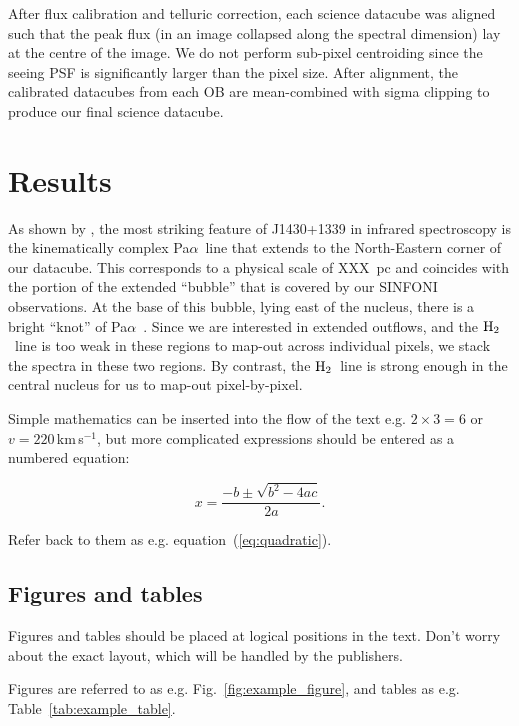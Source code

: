 \documentclass[a4paper,fleqn,usenatbib]{mnras}
\newcommand{\pa}{Pa$\alpha$}
\newcommand{\htwo}{${\rm H_{2}}$}
\begin{document}
After flux calibration and telluric correction, each science datacube was aligned such that the peak flux (in an image collapsed along the spectral dimension) lay at the centre of the image. We do not perform sub-pixel centroiding since the seeing PSF is significantly larger than the pixel size. After alignment, the calibrated datacubes from each OB are mean-combined with sigma clipping to produce our final science datacube.

\section{Results}
As shown by \cite{Ramos-Almeida17}, the most striking feature of J1430+1339 in infrared spectroscopy is the kinematically complex \pa\ line that extends to the North-Eastern corner of our datacube. This corresponds to a physical scale of XXX~pc and coincides with the portion of the extended ``bubble'' that is covered by our SINFONI observations. At the base of this bubble, lying east of the nucleus, there is a bright ``knot'' of \pa\ . Since we are interested in extended outflows, and the \htwo\ line is too weak in these regions to map-out across individual pixels, we stack the spectra in these two regions. By contrast, the \htwo\ line is strong enough in the central nucleus for us to map-out pixel-by-pixel.

\label{sec:maths} %

Simple mathematics can be inserted into the flow of the text e.g. $2\times3=6$
or $v=220$\,km\,s$^{-1}$, but more complicated expressions should be entered
as a numbered equation:

\begin{equation}
    x=\frac{-b\pm\sqrt{b^2-4ac}}{2a}.
	\label{eq:quadratic}
\end{equation}

Refer back to them as e.g. equation~(\ref{eq:quadratic}).

\subsection{Figures and tables}

Figures and tables should be placed at logical positions in the text. Don't
worry about the exact layout, which will be handled by the publishers.

Figures are referred to as e.g. Fig.~\ref{fig:example_figure}, and tables as
e.g. Table~\ref{tab:example_table}.
\end{document}
